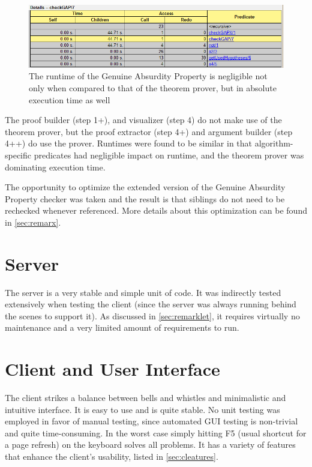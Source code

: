 \documentclass[11pt,twoside,a4paper]{report}
\begin{document}
\begin{figure}[htp]
\centerline{\includegraphics[scale=0.6]{img/scr-profile-absolutgap.png}}
\caption{The runtime of the Genuine Absurdity Property is negligible not only when compared to that of the theorem prover, but in absolute execution time as well\label{fig:scrprofileabsolutgap}}
\end{figure}

The proof builder (step 1+), and visualizer (step 4) do not make use of the theorem prover, but the proof extractor (step 4+) and argument builder (step 4++) do use the prover. Runtimes were found to be similar in that algorithm-specific predicates had negligible impact on runtime, and the theorem prover was dominating execution time.

The opportunity to optimize the extended version of the Genuine Absurdity Property checker was taken and the result is that siblings do not need to be rechecked whenever referenced. More details about this optimization can be found in \autoref{sec:remarx}.

\section{Server}
The server is a very stable and simple unit of code. It was indirectly tested extensively when testing the client (since the server was always running behind the scenes to support it). As discussed in \autoref{sec:remarklet}, it requires virtually no maintenance and a very limited amount of requirements to run.

\section{Client and User Interface}
The client strikes a balance between bells and whistles and minimalistic and intuitive interface. It is easy to use and is quite stable. No unit testing was employed in favor of manual testing, since automated GUI testing is non-trivial and quite time-consuming. In the worst case simply hitting F5 (usual shortcut for a page refresh) on the keyboard solves all problems. It has a variety of features that enhance the client's usability, listed in \autoref{sec:cleatures}.
\end{document}
